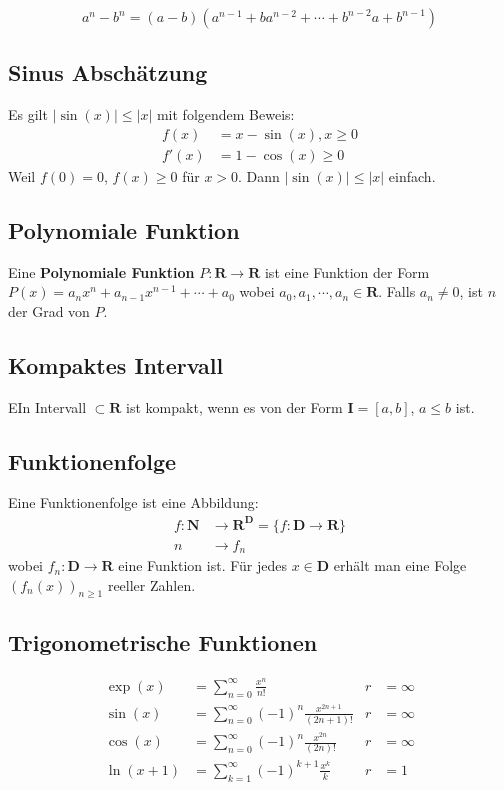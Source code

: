 \documentclass[8pt]{extarticle}
\def\sumk{\sum_{k=1}^\infty}
\def\sumn{\sum_{n=0}^\infty}
\begin{document}
\begin{multicols*}{3}
$$
  a^n - b^n = (a-b)(a^{n-1} + ba^{n-2} + \cdots + b^{n-2}a + b^{n-1})
$$

\subsection{Sinus Abschätzung}

Es gilt $|\sin(x)| \leq |x|$ mit folgendem Beweis:
\begin{align*}
  f(x) &= x - \sin(x), x \geq 0 \\
  f'(x) &= 1 - \cos(x) \geq 0
\end{align*}
Weil $f(0) = 0$, $f(x) \geq 0$ für $x > 0$. Dann $|\sin(x)| \leq |x|$ einfach. 

\subsection{Polynomiale Funktion}

Eine \textbf{Polynomiale Funktion} $P:\mathbf{R} \rightarrow \mathbf{R}$ ist eine Funktion
der Form $P(x) = a_nx^n + a_{n-1}x^{n-1} + \cdots + a_0$ wobei $a_0, a_1, \cdots, a_n \in \mathbf{R}$.
Falls $a_n \neq 0$, ist $n$ der Grad von $P$. 

\subsection{Kompaktes Intervall}

EIn Intervall $\subset \mathbf{R}$ ist kompakt, wenn es von der Form $\mathbf{I} = [a, b]$,
$a \leq b$ ist.

\subsection{Funktionenfolge}

Eine Funktionenfolge ist eine Abbildung:
\begin{align*}
  f:\mathbf{N} &\rightarrow \mathbf{R}^\mathbf{D} = \{f:\mathbf{D} \rightarrow \mathbf{R}\}\\
  n &\rightarrow f_n
\end{align*}
wobei $f_n: \mathbf{D} \rightarrow \mathbf{R}$ eine Funktion ist. Für jedes $x \in \mathbf{D}$
erhält man eine Folge $(f_n(x))_{n \geq 1}$ reeller Zahlen.


\subsection{Trigonometrische Funktionen}
\begin{align*}
\exp(x) &= \sumn \frac{x^n}{n!} & r &= \infty \\
\sin(x) &= \sumn (-1)^n \frac{x^{2n + 1}}{(2n + 1)!} & r &= \infty \\
\cos(x) &= \sumn (-1)^n \frac{x^{2n}}{(2n)!} & r &= \infty \\
\ln(x + 1) &= \sumk (-1)^{k+1} \frac{x^k}{k} & r &= 1
\end{align*}


\end{multicols*}
\end{document}
